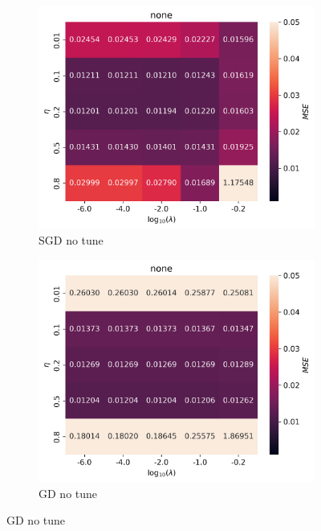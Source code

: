 \documentclass[11pt]{article}
\begin{document}
\begin{figure}[H]
    \begin{subfigure}{.5\textwidth}
        \centering
        \includegraphics[width=\textwidth]{../figures/none_SGD_eta_lmb.png}
        \caption{SGD no tune}
        \label{fig:}
    \end{subfigure}
    \begin{subfigure}{.5\textwidth}
        \centering
        \includegraphics[width=\textwidth]{../figures/none_GD_eta_lmb.png}
        \caption{GD no tune}
        \label{fig:}
    \end{subfigure}

\end{figure}
\end{document}
